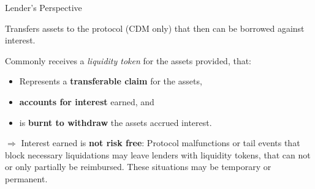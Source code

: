 \documentclass[]{beamer}
\begin{document}
\begin{frame}{Lender's Perspective}

Transfers assets to the protocol (CDM only) that then can be borrowed against interest.

\vspace{1.0em}

Commonly receives a \emph{liquidity token} for the assets provided, that:
\vspace{0.5em}
\begin{itemize}
  \item Represents a \textbf{transferable claim} for the assets,
  \item \textbf{accounts for interest} earned, and
  \item is \textbf{burnt to withdraw} the assets accrued interest.
\end{itemize}

 {
\vspace{1.0em}
$\Rightarrow$ Interest earned is \textbf{not risk free}: Protocol malfunctions or tail events that block necessary liquidations may leave lenders with liquidity tokens, that can not or only partially be reimbursed. These situations may be temporary or permanent.
}

\end{frame}
\end{document}
